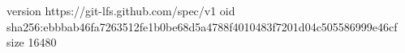 version https://git-lfs.github.com/spec/v1
oid sha256:ebbbab46fa7263512fe1b0be68d5a4788f4010483f7201d04c505586999e46cf
size 16480
